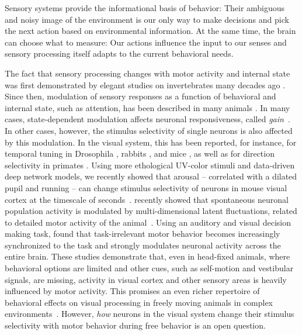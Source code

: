 \documentclass[B2,COG]{ercgrant}
\begin{document}
Sensory systems provide the informational basis of behavior: Their ambiguous and noisy image of the environment is our only way to make decisions and pick the next action based on environmental information. 
At the same time, the brain can choose what to measure: Our actions influence the input to our senses and sensory processing itself adapts to the current behavioral needs. 

% 

The fact that sensory processing changes with motor activity and internal state was first demonstrated by elegant studies on invertebrates many decades ago  \parencite{Rowell1971-zj, Wiersma1968-xt}.
Since then, modulation of sensory responses as a function of behavioral and internal state, such as attention, has been described in many animals \parencite[\eg][]{Maimon2010-sa, Niell2010-bs,Bezdudnaya2006-ge, Treue1996-lp, Musall2019-kd}.
In many cases, state-dependent modulation affects neuronal responsiveness, called \textit{gain}~\parencite{Eggermann2014-xp, Niell2010-bs, McAdams1999-cs,Schroder2020-jl, Dadarlat2017-jw, Mineault2016-fk}.
In other cases, however, the stimulus selectivity of single neurons is also affected by this modulation. 
In the visual system, this has been reported, for instance, for temporal tuning in Drosophila \parencite{Chiappe2010-bm}, rabbits \parencite{Bezdudnaya2006-ge}, and mice \parencite{Andermann2011-vw}, as well as for direction selectivity in primates \parencite{Treue1996-lp}.
Using more ethological UV-color stimuli and data-driven deep network models, we recently showed that arousal -- correlated with a dilated pupil and running -- can change stimulus selectivity of neurons in mouse visual cortex at the timescale of seconds~\parencite{Franke2022-do}. 
\textcite{Stringer2019-lt} recently showed that spontaneous neuronal population activity is modulated by multi-dimensional latent fluctuations, related to detailed motor activity of the animal~\parencite{Syeda2022-bk}.
Using an auditory and visual decision making task, \textcite{Musall2019-kd} found that task-irrelevant motor behavior becomes increasingly synchronized to the task and strongly modulates neuronal activity across the entire brain.
These studies demonstrate that, even in head-fixed animals, where behavioral options are limited and other cues, such as self-motion and vestibular signals, are missing, activity in visual cortex and other sensory areas is heavily influenced by motor activity.
This promises an even richer repertoire of behavioral effects on visual processing in freely moving animals in complex environments~\parencite{Busse2017-rt,Huk2018-ez, Datta2019-qj}.
However, \textit{how} neurons in the visual system change their stimulus selectivity with motor behavior during free behavior is an open question. 
\end{document}
